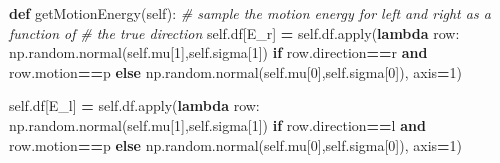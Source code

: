 \documentclass[12pt,twoside]{reedthesis}
\newenvironment{Shaded}{\begin{snugshade}}{\end{snugshade}}
\newcommand{\BuiltInTok}[1]{#1}
\newcommand{\CommentTok}[1]{\textcolor[rgb]{0.56,0.35,0.01}{\textit{#1}}}
\newcommand{\ControlFlowTok}[1]{\textcolor[rgb]{0.13,0.29,0.53}{\textbf{#1}}}
\newcommand{\DecValTok}[1]{\textcolor[rgb]{0.00,0.00,0.81}{#1}}
\newcommand{\KeywordTok}[1]{\textcolor[rgb]{0.13,0.29,0.53}{\textbf{#1}}}
\newcommand{\NormalTok}[1]{#1}
\newcommand{\OperatorTok}[1]{\textcolor[rgb]{0.81,0.36,0.00}{\textbf{#1}}}
\newcommand{\StringTok}[1]{\textcolor[rgb]{0.31,0.60,0.02}{#1}}
\newcommand{\VariableTok}[1]{\textcolor[rgb]{0.00,0.00,0.00}{#1}}
\begin{document}
\begin{Shaded}
\begin{Highlighting}[]
    \KeywordTok{def}\NormalTok{ getMotionEnergy(}\VariableTok{self}\NormalTok{):}
    \CommentTok{\# sample the motion energy for left and right as a function of }
    \CommentTok{\# the true direction}
        \VariableTok{self}\NormalTok{.df[}\StringTok{\textquotesingle{}E\_r\textquotesingle{}}\NormalTok{] }\OperatorTok{=} \VariableTok{self}\NormalTok{.df.}\BuiltInTok{apply}\NormalTok{(}\KeywordTok{lambda}\NormalTok{ row: }
\NormalTok{               np.random.normal(}\VariableTok{self}\NormalTok{.mu[}\DecValTok{1}\NormalTok{],}\VariableTok{self}\NormalTok{.sigma[}\DecValTok{1}\NormalTok{]) }
               \ControlFlowTok{if}\NormalTok{ row.direction}\OperatorTok{==}\StringTok{\textquotesingle{}r\textquotesingle{}} \KeywordTok{and}\NormalTok{ row.motion}\OperatorTok{==}\StringTok{\textquotesingle{}p\textquotesingle{}}
               \ControlFlowTok{else}\NormalTok{ np.random.normal(}\VariableTok{self}\NormalTok{.mu[}\DecValTok{0}\NormalTok{],}\VariableTok{self}\NormalTok{.sigma[}\DecValTok{0}\NormalTok{]),}
\NormalTok{               axis}\OperatorTok{=}\DecValTok{1}\NormalTok{)}

        \VariableTok{self}\NormalTok{.df[}\StringTok{\textquotesingle{}E\_l\textquotesingle{}}\NormalTok{] }\OperatorTok{=} \VariableTok{self}\NormalTok{.df.}\BuiltInTok{apply}\NormalTok{(}\KeywordTok{lambda}\NormalTok{ row: }
\NormalTok{               np.random.normal(}\VariableTok{self}\NormalTok{.mu[}\DecValTok{1}\NormalTok{],}\VariableTok{self}\NormalTok{.sigma[}\DecValTok{1}\NormalTok{]) }
               \ControlFlowTok{if}\NormalTok{ row.direction}\OperatorTok{==}\StringTok{\textquotesingle{}l\textquotesingle{}} \KeywordTok{and}\NormalTok{ row.motion}\OperatorTok{==}\StringTok{\textquotesingle{}p\textquotesingle{}}
               \ControlFlowTok{else}\NormalTok{ np.random.normal(}\VariableTok{self}\NormalTok{.mu[}\DecValTok{0}\NormalTok{],}\VariableTok{self}\NormalTok{.sigma[}\DecValTok{0}\NormalTok{]),}
\NormalTok{               axis}\OperatorTok{=}\DecValTok{1}\NormalTok{)}
       

\end{Highlighting}
\end{Shaded}
\end{document}
